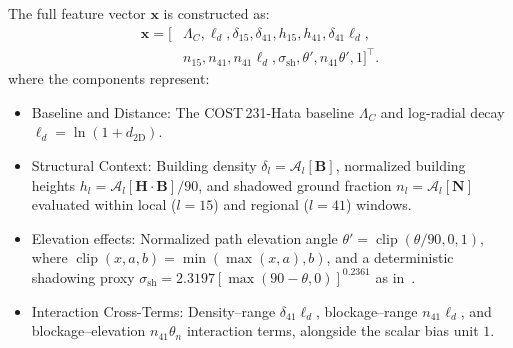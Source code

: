 \documentclass[10pt,conference,letterpaper]{IEEEtran}
\begin{document}
The full feature vector $\mathbf{x}$ is constructed as:
\begin{equation}
\begin{aligned}
\mathbf x=[&\Lambda_{C},\ell_d,\delta_{15},\delta_{41},h_{15},h_{41},
\delta_{41}\ell_d,\\
&n_{15},n_{41},n_{41}\ell_d,\sigma_{\mathrm{sh}},\theta',
n_{41}\theta',1]^{\top}.
\end{aligned}
\label{eq:nlos-vector}
\end{equation}
where the components represent:
\begin{itemize}
    \item Baseline and Distance: The COST\,231-Hata baseline $\Lambda_C$ and log-radial decay $\ell_d = \ln(1 + d_{\text{2D}})$.
    \item Structural Context: Building density $\delta_l = \mathcal{A}_l[\mathbf{B}]$, normalized building heights $h_l = \mathcal{A}_l[\mathbf{H} \cdot \mathbf{B}] / 90$, and shadowed ground fraction $n_l = \mathcal{A}_l[\mathbf{N}]$ evaluated within local ($l=15$) and regional ($l=41$) windows.
    \item Elevation effects: Normalized path elevation angle $\theta' = \operatorname{clip}(\theta / 90, 0, 1)$, where $\operatorname{clip}(x,a,b)=\min(\max(x,a),b)$, and a deterministic shadowing proxy $\sigma_{\text{sh}} = 2.3197 \left[\max(90 - \theta, 0)\right]^{0.2361}$ as in~\cite{feng2006a2g}.
    \item Interaction Cross-Terms: Density--range $\delta_{41}\ell_d$, blockage--range $n_{41}\ell_d$, and blockage--elevation $n_{41}\theta_n$ interaction terms, alongside the scalar bias unit $1$.
\end{itemize}
\end{document}
